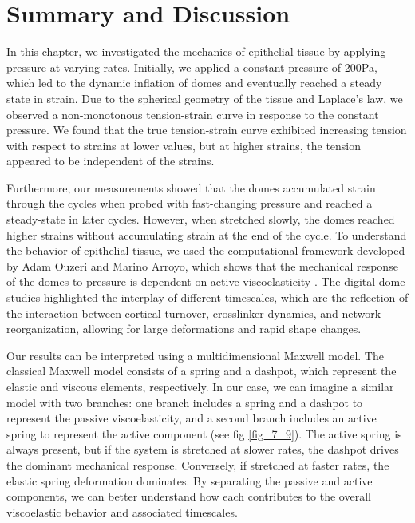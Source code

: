 \clearpage
\hypertarget{summary}{%
	\section{Summary and Discussion}\label{summary}}

In this chapter, we investigated the mechanics of epithelial tissue by applying pressure at varying rates. Initially, we applied a constant pressure of 200Pa, which led to the dynamic inflation of domes and eventually reached a steady state in strain. Due to the spherical geometry of the tissue and Laplace’s law, we observed a non-monotonous tension-strain curve in response to the constant pressure. We found that the true tension-strain curve exhibited increasing tension with respect to strains at lower values, but at higher strains, the tension appeared to be independent of the strains. 

Furthermore, our measurements showed that the domes accumulated strain through the cycles when probed with fast-changing pressure and reached a steady-state in later cycles. However, when stretched slowly, the domes reached higher strains without accumulating strain at the end of the cycle. To understand the behavior of epithelial tissue, we used the computational framework developed by Adam Ouzeri and Marino Arroyo, which shows that the mechanical response of the domes to pressure is dependent on active viscoelasticity \cite{ouzeri2023}. The digital dome studies highlighted the interplay of different timescales, which are the reflection of the interaction between cortical turnover, crosslinker dynamics, and network reorganization, allowing for large deformations and rapid shape changes. 

Our results can be interpreted using a multidimensional Maxwell model. The classical Maxwell model consists of a spring and a dashpot, which represent the elastic and viscous elements, respectively. In our case, we can imagine a similar model with two branches: one branch includes a spring and a dashpot to represent the passive viscoelasticity, and a second branch includes an active spring to represent the active component  (see fig \ref{fig_7_9}). The active spring is always present, but if the system is stretched at slower rates, the dashpot drives the dominant mechanical response. Conversely, if stretched at faster rates, the elastic spring deformation dominates. By separating the passive and active components, we can better understand how each contributes to the overall viscoelastic behavior and associated timescales. 

